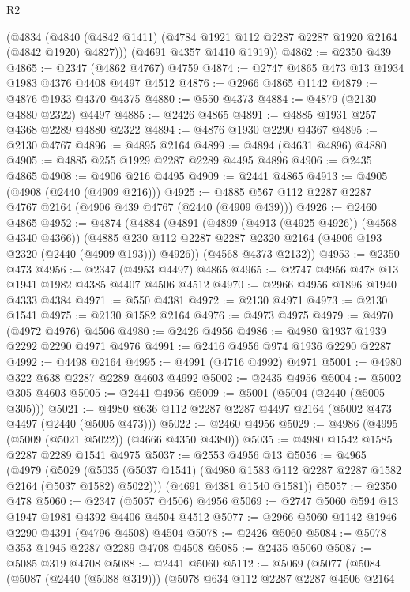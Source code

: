 \begin{lexlean}{R2}
\begin{coremodule}
      (@4834 (@4840 (@4842 @1411) (@4784 @1921 @112 @2287 @2287 @1920 @2164 (@4842 @1920) @4827)))
      (@4691 @4357 @1410 @1919))
@4862 := @2350 @439
@4865 := @2347 (@4862 @4767) @4759
@4874 := @2747 @4865 @473 @13 @1934 @1983 @4376 @4408 @4497 @4512
@4876 := @2966 @4865 @1142
@4879 := @4876 @1933 @4370 @4375
@4880 := @550 @4373
@4884 := @4879 (@2130 @4880 @2322) @4497
@4885 := @2426 @4865
@4891 := @4885 @1931 @257 @4368 @2289 @4880 @2322
@4894 := @4876 @1930 @2290 @4367
@4895 := @2130 @4767
@4896 := @4895 @2164
@4899 := @4894 (@4631 @4896) @4880
@4905 := @4885 @255 @1929 @2287 @2289 @4495 @4896
@4906 := @2435 @4865
@4908 := @4906 @216 @4495
@4909 := @2441 @4865
@4913 := @4905 (@4908 (@2440 (@4909 @216)))
@4925 := @4885 @567 @112 @2287 @2287 @4767 @2164 (@4906 @439 @4767 (@2440 (@4909 @439)))
@4926 := @2460 @4865
@4952 := @4874
    (@4884
      (@4891
        (@4899 (@4913 (@4925 @4926)) (@4568 @4340 @4366))
        (@4885 @230 @112 @2287 @2287 @2320 @2164 (@4906 @193 @2320 (@2440 (@4909 @193))) @4926))
      (@4568 @4373 @2132))
@4953 := @2350 @473
@4956 := @2347 (@4953 @4497) @4865
@4965 := @2747 @4956 @478 @13 @1941 @1982 @4385 @4407 @4506 @4512
@4970 := @2966 @4956 @1896 @1940 @4333 @4384
@4971 := @550 @4381
@4972 := @2130 @4971
@4973 := @2130 @1541
@4975 := @2130 @1582 @2164
@4976 := @4973 @4975
@4979 := @4970 (@4972 @4976) @4506
@4980 := @2426 @4956
@4986 := @4980 @1937 @1939 @2292 @2290 @4971 @4976
@4991 := @2416 @4956 @974 @1936 @2290 @2287
@4992 := @4498 @2164
@4995 := @4991 (@4716 @4992) @4971
@5001 := @4980 @322 @638 @2287 @2289 @4603 @4992
@5002 := @2435 @4956
@5004 := @5002 @305 @4603
@5005 := @2441 @4956
@5009 := @5001 (@5004 (@2440 (@5005 @305)))
@5021 := @4980 @636 @112 @2287 @2287 @4497 @2164 (@5002 @473 @4497 (@2440 (@5005 @473)))
@5022 := @2460 @4956
@5029 := @4986 (@4995 (@5009 (@5021 @5022)) (@4666 @4350 @4380))
@5035 := @4980 @1542 @1585 @2287 @2289 @1541 @4975
@5037 := @2553 @4956 @13
@5056 := @4965
    (@4979
      (@5029 (@5035 (@5037 @1541) (@4980 @1583 @112 @2287 @2287 @1582 @2164 (@5037 @1582) @5022)))
      (@4691 @4381 @1540 @1581))
@5057 := @2350 @478
@5060 := @2347 (@5057 @4506) @4956
@5069 := @2747 @5060 @594 @13 @1947 @1981 @4392 @4406 @4504 @4512
@5077 := @2966 @5060 @1142 @1946 @2290 @4391 (@4796 @4508) @4504
@5078 := @2426 @5060
@5084 := @5078 @353 @1945 @2287 @2289 @4708 @4508
@5085 := @2435 @5060
@5087 := @5085 @319 @4708
@5088 := @2441 @5060
@5112 := @5069
    (@5077
      (@5084
        (@5087 (@2440 (@5088 @319)))
        (@5078
          @634
          @112
          @2287
          @2287
          @4506
          @2164

\end{coremodule}
\end{lexlean}
